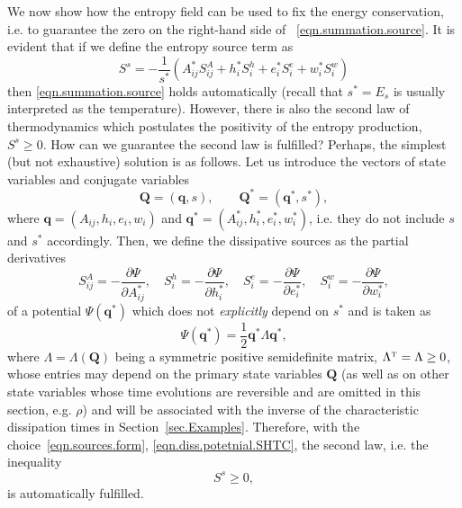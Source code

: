 \documentclass[twoside]{article}
\newcommand{\qq}{{\boldsymbol{q}}}
\newcommand{\QQ}{{\boldsymbol{Q}}}
\newcommand{\ted}{E} %
\newcommand{\pd}{\partial}
\newcommand{\transpose}{{\rm {\mathsmaller T}}}
\begin{document}

We now show how the entropy field can be used to fix the energy conservation, 
i.e. to guarantee the zero on the right-hand side of~ 
\eqref{eqn.summation.source}. It is evident that if we 
define the entropy source term as
\begin{equation}\label{eqn.summation.entropy}
S^s =- \frac{1}{s^* }( A_{ij}^* S^A_{ij} + h_i^*S^h_i + e_i^* S^e_i + 
w_i^*S^w_i)
\end{equation}
then \eqref{eqn.summation.source} holds automatically (recall that $ s^* = 
\ted_{s} $ is usually interpreted as the temperature). However, there is 
also 
the second law of thermodynamics which postulates the positivity of the 
entropy production, $ S^s \geq 
0$. How can we guarantee the second law is fulfilled? Perhaps, the simplest (but 
not 
exhaustive)
solution is as follows. Let us introduce the vectors of state variables and 
conjugate variables
\begin{equation}
\QQ = (\qq,s), \qquad \QQ^* = (\qq^*,s^*),
\end{equation}
where $ \qq = (A_{ij} ,  h_i , e_i ,  w_i )$ and $ \qq^* = (A_{ij}^* ,  
h_i^* , e_i^* ,  w_i^* )$, i.e. they do not 
include $ s  $ and $ s^* $ accordingly. Then, we define the 
dissipative sources as the partial derivatives
\begin{equation}\label{eqn.sources.form}
S^A_{ij} =-\frac{\pd \Psi}{\pd A_{ij}^*}, \quad S^h_i =-\frac{\pd \Psi}{\pd 
h_i^*},\quad  S^e_i 
=-\frac{\pd \Psi}{\pd e_i^*}, \quad S^w_i =-\frac{\pd \Psi}{\pd w_i^*},
\end{equation}
of a potential $ \Psi(\qq^*)$ which does not \textit{explicitly} depend on $ 
s^* $ and 
is 
taken as
\begin{equation}\label{eqn.diss.potetnial.SHTC}
\Psi(\qq^*) = \frac{1}{2} {\qq^*} \Lambda \qq^*,
\end{equation}
where $ \Lambda = \Lambda(\QQ) $ being a symmetric positive semidefinite 
matrix, $ 
\Lambda^\transpose 
= \Lambda \geq 0$, whose entries may depend on the primary state variables $ 
\QQ $ (as well as on other state  variables whose time evolutions are 
reversible and are omitted in this section, e.g. $ \rho $) and will 
be 
associated with the inverse of the characteristic 
dissipation times in Section~\ref{sec.Examples}. Therefore, with the 
choice~\eqref{eqn.sources.form}, \eqref{eqn.diss.potetnial.SHTC}, the second 
law, i.e. the inequality
\begin{equation}
S^s \geq 0,
\end{equation}
is automatically fulfilled. 
\end{document}

